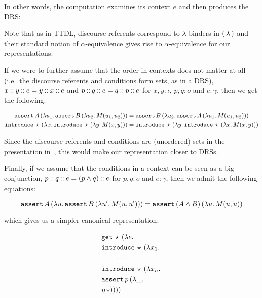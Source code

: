 In other words, the computation examines its context $e$ and then produces
the DRS:

\vspace{2mm}


\vspace{2mm}

Note that as in TTDL, discourse referents correspond to $\lambda$-binders
in $\llparenthesis \, \lambda \, \rrparenthesis$ and their standard notion of $\alpha$-equivalence
gives rise to $\alpha$-equivalence for our representations.

If we were to further assume that the order in contexts does not matter at
all (i.e.\ the discourse referents and conditions form sets, as in a DRS),
$x \mathbin{::} y \mathbin{::} e = y \mathbin{::} x \mathbin{::} e$ and
$p \mathbin{::} q \mathbin{::} e = q \mathbin{::} p \mathbin{::} e$ for $x, y : \iota$, $p, q : o$ and
$e : \gamma$, then we get the following:

\begin{align*}
   \mathtt{assert}\,A\,(\lambda u_1.\, \mathtt{assert}\,B\,(\lambda u_2.\, M(u_1, u_2))) 
&= \mathtt{assert}\,B\,(\lambda u_2.\, \mathtt{assert}\,A\,(\lambda u_1.\, M(u_1, u_2))) \\
   \mathtt{introduce}\,\star\,(\lambda x.\, \mathtt{introduce}\,\star\,(\lambda y.\, M(x, y))) 
&= \mathtt{introduce}\,\star\,(\lambda y.\, \mathtt{introduce}\,\star\,(\lambda x.\, M(x, y)))
\end{align*}

Since the discourse referents and conditions are (unordered) sets in the
presentation in~\cite{kamp1993discourse}, this would make our
representation closer to DRSs.

Finally, if we assume that the conditions in a context can be seen as a big
conjunction, $p \mathbin{::} q \mathbin{::} e = (p \land q) \mathbin{::} e$ for $p, q : o$ and
$e : \gamma$, then we admit the following equations:

$$
  \mathtt{assert}\,A\,(\lambda u.\, \mathtt{assert}\,B\,(\lambda u'.\, M(u, u'))) 
= \mathtt{assert}\,(A \land B)\,(\lambda u.\, M(u, u))
$$

which gives us a simpler canonical representation:

\begin{align*}
  &\mathtt{get}\,\star\,(\lambda e.\,  \\
  &\mathtt{introduce}\,\star\,(\lambda x_1.\,  \\
  &\qquad \cdots \\
  &\mathtt{introduce}\,\star\,(\lambda x_n.\,  \\
  &\mathtt{assert}\,p\,(\lambda \_.\,  \\
  &\eta\,\star))))
\end{align*}

